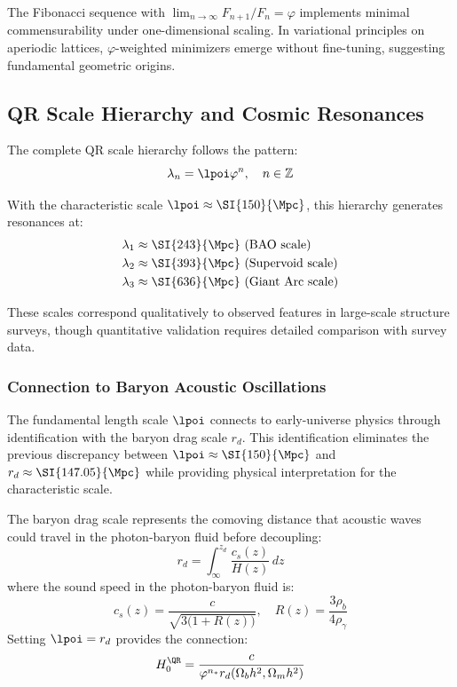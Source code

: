 The Fibonacci sequence with $\lim_{n \to \infty} F_{n+1}/F_n = \varphi$ implements minimal commensurability under one-dimensional scaling. In variational principles on aperiodic lattices, $\varphi$-weighted minimizers emerge without fine-tuning, suggesting fundamental geometric origins.

\subsection{QR Scale Hierarchy and Cosmic Resonances}
\label{subsec:scale-hierarchy}

The complete QR scale hierarchy follows the pattern:
\begin{equation}
\lambda_n = \lpoi \varphi^n, \quad n \in \mathbb{Z}
\label{eq:scale-hierarchy}
\end{equation}

With the characteristic scale $\lpoi \approx \SI{150}{\Mpc}$, this hierarchy generates resonances at:
\begin{align}
\lambda_1 &\approx \SI{243}{\Mpc}\ \text{(BAO scale)}\\
\lambda_2 &\approx \SI{393}{\Mpc}\ \text{(Supervoid scale)}\\
\lambda_3 &\approx \SI{636}{\Mpc}\ \text{(Giant Arc scale)}
\label{eq:cosmic-resonances}
\end{align}

These scales correspond qualitatively to observed features in large-scale structure surveys, though quantitative validation requires detailed comparison with survey data.

\subsubsection{Connection to Baryon Acoustic Oscillations}
\label{subsubsec:bao-connection}

The fundamental length scale $\lpoi$ connects to early-universe physics through identification with the baryon drag scale $r_d$. This identification eliminates the previous discrepancy between $\lpoi \approx \SI{150}{\Mpc}$ and $r_d \approx \SI{147.05}{\Mpc}$ while providing physical interpretation for the characteristic scale.

The baryon drag scale represents the comoving distance that acoustic waves could travel in the photon-baryon fluid before decoupling:
\begin{equation}
r_d = \int_{\infty}^{z_d} \frac{c_s(z)}{H(z)}\, dz
\label{eq:drag-scale-integral}
\end{equation}
where the sound speed in the photon-baryon fluid is:
\begin{equation}
c_s(z) = \frac{c}{\sqrt{3\bigl(1 + R(z)\bigr)}}, \quad R(z) = \frac{3\rho_b}{4\rho_\gamma}
\label{eq:sound-speed}
\end{equation}
Setting $\lpoi = r_d$ provides the connection:
\begin{equation}
H_0^{\QR} = \frac{c}{\varphi^{n_*} r_d(\Omega_b h^2, \Omega_m h^2)}
\label{eq:hubble-qr}
\end{equation}

